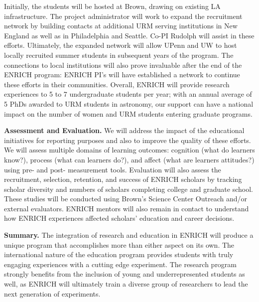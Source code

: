 \documentclass[preprint,11pt]{aastex}
\begin{document}
Initially, the students will be hosted at Brown, drawing on existing LA infrastructure.  
The project administrator will work to expand the recruitment network by building contacts at additional URM serving institutions in New England as well as in Philadelphia and Seattle.  Co-PI Rudolph will assist in these efforts.  Ultimately, the expanded network will allow UPenn and UW to host locally recruited summer students in subsequent years of the program.  The connections to local institutions will also prove invaluable after the end of the ENRICH program: 
ENRICH PI's will have established a network to continue these efforts in their communities.
Overall, ENRICH will provide research experiences to 5 to 7 undergraduate students per year; with an annual average of 5 PhDs awarded to URM students in astronomy, our support can have a national impact on the number of women and URM students entering graduate programs.

\textbf{Assessment and Evaluation.} We 
will 
address the impact of the educational initiatives for reporting purposes and also to improve the quality of these efforts. %
We will assess multiple domains of learning outcomes: cognition (what do learners know?), process (what can learners do?), and affect (what are learners attitudes?) using pre- and post- measurement tools.
Evaluation will also assess the recruitment, selection, retention, and success of ENRICH scholars by tracking 
scholar diversity and numbers of scholars completing college and graduate school. These studies will be conducted using Brown's Science Center Outreach 
and/or external evaluators.  ENRICH mentors will also 
remain in contact
to understand how ENRICH experiences affected scholars' education and career decisions.

\textbf{Summary.} The integration of research and education in ENRICH will produce a unique program that accomplishes more than either aspect on its own.  The international nature of the education program provides students with truly engaging experiences with a cutting edge experiment.  The research program strongly benefits from the inclusion of young and underrepresented students as well, as ENRICH will ultimately train a diverse group of researchers to lead the next generation of experiments.  

\clearpage
\setcounter{page}{1}
\thispagestyle{empty}


\end{document}
